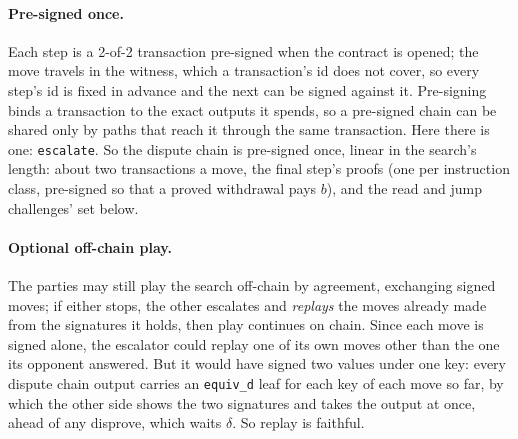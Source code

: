 \documentclass[11pt]{article}
\newcommand{\tx}[1]{\texttt{#1}}
\begin{document}
\paragraph{Pre-signed once.} Each step is a 2-of-2 transaction
pre-signed when the contract is opened; the move travels in the witness,
which a transaction's id does not cover, so every step's id is fixed in
advance and the next can be signed against it. Pre-signing binds a
transaction to the exact outputs it spends, so a pre-signed chain can be
shared only by paths that reach it through the same transaction. Here
there is one: \tx{escalate}. So the dispute chain is pre-signed once, linear in
the search's length: about two transactions a move, the final step's
proofs (one per instruction class, pre-signed so that a proved
withdrawal pays $b$), and the read and jump challenges' set
below.

\paragraph{Optional off-chain play.} The parties may still play the
search off-chain by agreement, exchanging signed moves; if either stops,
the other escalates and \emph{replays} the moves already made from the
signatures it holds, then play continues on chain. Since each move is
signed alone, the escalator could replay one of its own moves other than
the one its opponent answered. But it would have signed two values under
one key: every dispute chain output carries an \tx{equiv\_d} leaf for each key
of each move so far, by which the other side shows the two signatures
and takes the output at once, ahead of any disprove, which waits
$\delta$. So replay is faithful.
\end{document}
